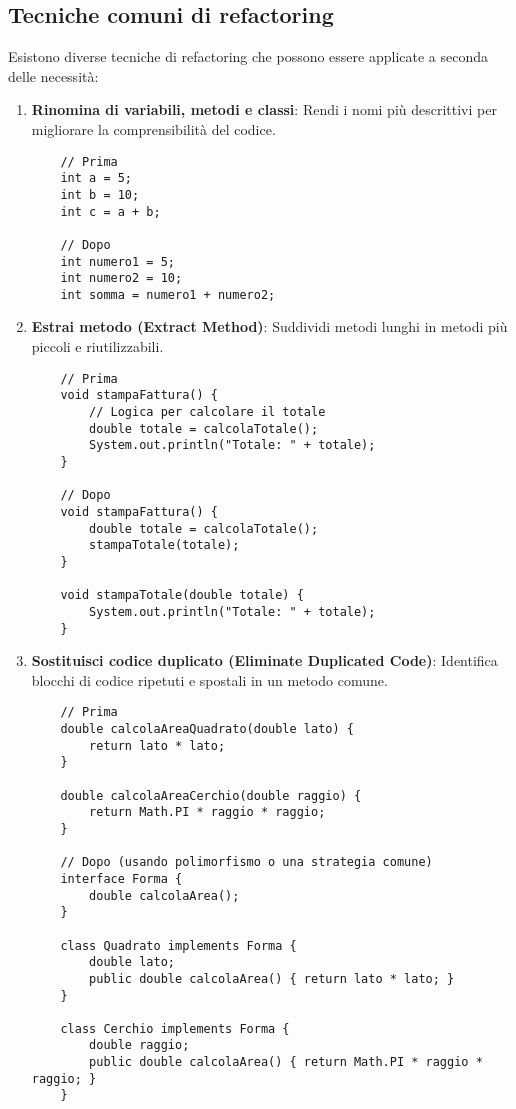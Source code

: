 \documentclass{article}
\begin{document}
\subsection{Tecniche comuni di refactoring}
Esistono diverse tecniche di refactoring che possono essere applicate a seconda delle necessità:

\begin{enumerate}
    \item \textbf{Rinomina di variabili, metodi e classi}:
    Rendi i nomi più descrittivi per migliorare la comprensibilità del codice.
    \begin{lstlisting}
    // Prima
    int a = 5;
    int b = 10;
    int c = a + b;
    
    // Dopo
    int numero1 = 5;
    int numero2 = 10;
    int somma = numero1 + numero2;
    \end{lstlisting}

    \item \textbf{Estrai metodo (Extract Method)}:
    Suddividi metodi lunghi in metodi più piccoli e riutilizzabili.
    \begin{lstlisting}
    // Prima
    void stampaFattura() {
        // Logica per calcolare il totale
        double totale = calcolaTotale();
        System.out.println("Totale: " + totale);
    }
    
    // Dopo
    void stampaFattura() {
        double totale = calcolaTotale();
        stampaTotale(totale);
    }
    
    void stampaTotale(double totale) {
        System.out.println("Totale: " + totale);
    }
    \end{lstlisting}

    \item \textbf{Sostituisci codice duplicato (Eliminate Duplicated Code)}:
    Identifica blocchi di codice ripetuti e spostali in un metodo comune.
    \begin{lstlisting}
    // Prima
    double calcolaAreaQuadrato(double lato) {
        return lato * lato;
    }

    double calcolaAreaCerchio(double raggio) {
        return Math.PI * raggio * raggio;
    }
    
    // Dopo (usando polimorfismo o una strategia comune)
    interface Forma {
        double calcolaArea();
    }
    
    class Quadrato implements Forma {
        double lato;
        public double calcolaArea() { return lato * lato; }
    }

    class Cerchio implements Forma {
        double raggio;
        public double calcolaArea() { return Math.PI * raggio * raggio; }
    }
    \end{lstlisting}


\end{enumerate}
\end{document}
